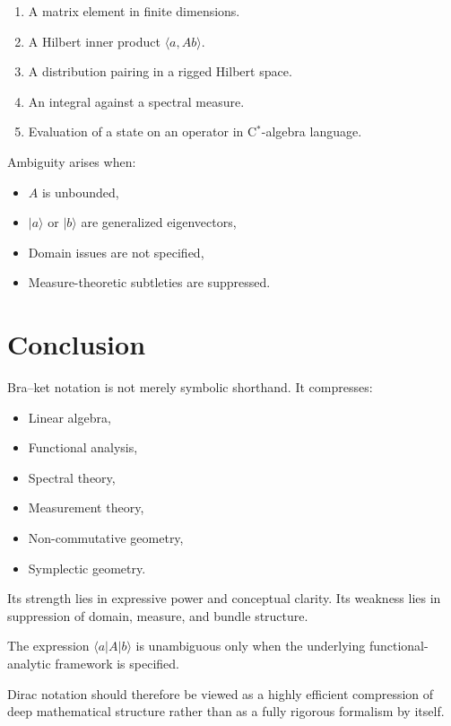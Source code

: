 \documentclass[12pt]{article}
\begin{document}
\begin{enumerate}
\item A matrix element in finite dimensions.
\item A Hilbert inner product $\langle a, Ab\rangle$.
\item A distribution pairing in a rigged Hilbert space.
\item An integral against a spectral measure.
\item Evaluation of a state on an operator in C$^*$-algebra language.
\end{enumerate}

Ambiguity arises when:

\begin{itemize}
\item $A$ is unbounded,
\item $|a\rangle$ or $|b\rangle$ are generalized eigenvectors,
\item Domain issues are not specified,
\item Measure-theoretic subtleties are suppressed.
\end{itemize}

\section{Conclusion}

Bra--ket notation is not merely symbolic shorthand.
It compresses:

\begin{itemize}
\item Linear algebra,
\item Functional analysis,
\item Spectral theory,
\item Measurement theory,
\item Non-commutative geometry,
\item Symplectic geometry.
\end{itemize}

Its strength lies in expressive power and conceptual clarity.
Its weakness lies in suppression of domain, measure,
and bundle structure.

The expression $\langle a|A|b\rangle$ is unambiguous
only when the underlying functional-analytic framework is specified.

Dirac notation should therefore be viewed as a highly efficient
compression of deep mathematical structure rather than
as a fully rigorous formalism by itself.
\end{document}

